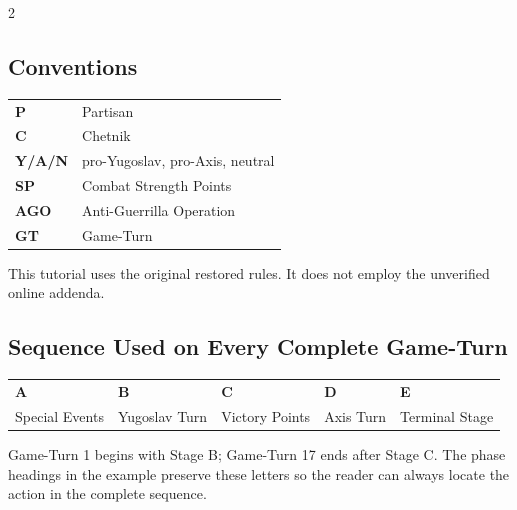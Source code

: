 \begin{multicols}{2}
\subsection{Conventions}

\begin{tabularx}{\linewidth}{@{}>{\bfseries}l X@{}}
  P & Partisan \\
  C & Chetnik \\
  Y/A/N & pro-Yugoslav, pro-Axis, neutral \\
  SP & Combat Strength Points \\
  AGO & Anti-Guerrilla Operation \\
  GT & Game-Turn \\
\end{tabularx}

\begin{commentarybox}
This tutorial uses the original restored rules. It does not employ the
unverified online addenda.
\end{commentarybox}
\end{multicols}

\subsection{Sequence Used on Every Complete Game-Turn}

\begin{tabularx}{\linewidth}{@{}>{\centering\arraybackslash}p{0.75in}
  >{\centering\arraybackslash}X >{\centering\arraybackslash}X
  >{\centering\arraybackslash}X >{\centering\arraybackslash}X@{}}
  \rowcolor{TitoInk!15}
  \sffamily\bfseries A & \sffamily\bfseries B & \sffamily\bfseries C &
    \sffamily\bfseries D & \sffamily\bfseries E \\
  Special Events & Yugoslav Turn & Victory Points & Axis Turn & Terminal Stage
\end{tabularx}

\small
Game-Turn 1 begins with Stage B; Game-Turn 17 ends after Stage C. The phase
headings in the example preserve these letters so the reader can always
locate the action in the complete sequence.


